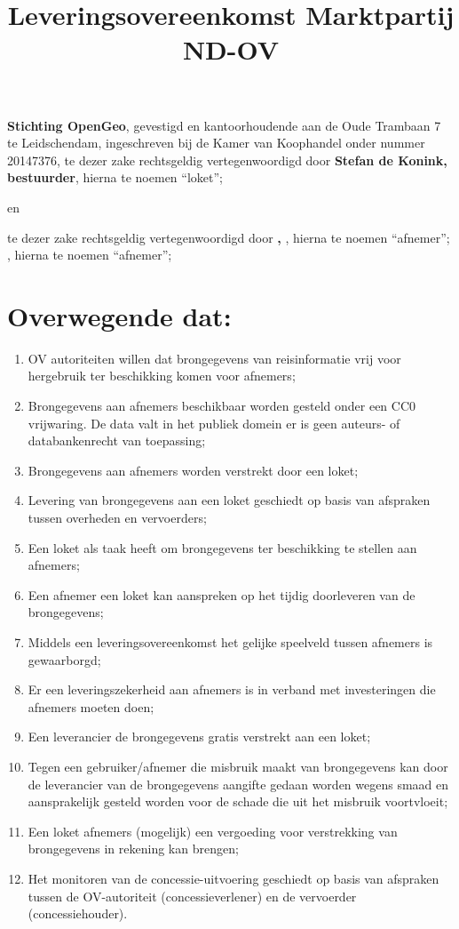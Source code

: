 \documentclass[10pt, a4paper]{article}
\title{Leveringsovereenkomst Marktpartij ND-OV\vspace{-2ex}}
\begin{document}
\maketitle
\thispagestyle{empty}
\pagestyle{empty}
\textbf{Stichting OpenGeo}, gevestigd en kantoorhoudende aan de Oude Trambaan 7 te Leidschendam, ingeschreven bij de Kamer van Koophandel onder nummer 20147376, te dezer zake rechtsgeldig vertegenwoordigd door \textbf{Stefan de Konink, bestuurder}, hierna te noemen ``loket'';
\begin{center}
en\\
\end{center}
\ifdefined\onderneming
    \textbf{\onderneming} te dezer zake rechtsgeldig vertegenwoordigd door \textbf{\tekenbevoegd, \functie}, hierna te noemen ``afnemer'';
\else
    \textbf{\tekenbevoegd}, hierna te noemen ``afnemer'';
\fi

\section*{Overwegende dat:}
\begin{enumerate}
\item OV autoriteiten willen dat brongegevens van reisinformatie vrij voor hergebruik ter beschikking komen voor afnemers;
\item Brongegevens aan afnemers beschikbaar worden gesteld onder een CC0 vrijwaring. De data valt in het publiek domein er is geen auteurs- of databankenrecht van toepassing;
\item Brongegevens aan afnemers worden verstrekt door een loket;
\item Levering van brongegevens aan een loket geschiedt op basis van afspraken tussen overheden en vervoerders;
\item Een loket als taak heeft om brongegevens ter beschikking te stellen aan afnemers;
\item Een afnemer een loket kan aanspreken op het tijdig doorleveren van de brongegevens;
\item Middels een leveringsovereenkomst het gelijke speelveld tussen afnemers is gewaarborgd;
\item Er een leveringszekerheid aan afnemers is in verband met investeringen die afnemers moeten doen;
\item Een leverancier de brongegevens gratis verstrekt aan een loket;
\item Tegen een gebruiker/afnemer die misbruik maakt van brongegevens kan door de leverancier van de brongegevens aangifte gedaan worden wegens smaad en aansprakelijk gesteld worden voor de schade die uit het misbruik voortvloeit;
\item Een loket afnemers (mogelijk) een vergoeding voor verstrekking van brongegevens in rekening kan brengen;
\item Het monitoren van de concessie-uitvoering geschiedt op basis van afspraken tussen de OV-autoriteit (concessieverlener) en de vervoerder (concessiehouder).
\end{enumerate}
\end{document}

